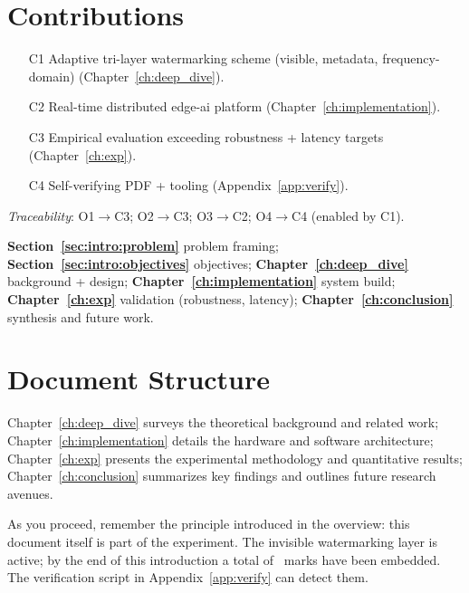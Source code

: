 \section{Contributions}
\label{sec:intro:contributions}

\begin{enumerate}
  \item[C1] Adaptive tri-layer watermarking scheme (visible, metadata, frequency-domain) (Chapter~\ref{ch:deep_dive}).
  \item[C2] Real-time distributed edge-\gls{ai} platform (Chapter~\ref{ch:implementation}).
  \item[C3] Empirical evaluation exceeding robustness + latency targets (Chapter~\ref{ch:exp}).
  \item[C4] Self-verifying PDF + tooling (Appendix~\ref{app:verify}).
\end{enumerate}

\noindent\textit{Traceability}: O1$\rightarrow$C3; O2$\rightarrow$C3; O3$\rightarrow$C2; O4$\rightarrow$C4 (enabled by C1).

\begin{roadmapbox}
\textbf{Section~\ref{sec:intro:problem}} problem framing; \textbf{Section~\ref{sec:intro:objectives}} objectives; \textbf{Chapter~\ref{ch:deep_dive}} background + design; \textbf{Chapter~\ref{ch:implementation}} system build; \textbf{Chapter~\ref{ch:exp}} validation (robustness, latency); \textbf{Chapter~\ref{ch:conclusion}} synthesis and future work.
\end{roadmapbox}

\section{Document Structure}
\label{sec:intro:structure}

Chapter~\ref{ch:deep_dive} surveys the theoretical background and related
work; Chapter~\ref{ch:implementation} details the hardware and
software architecture; Chapter~\ref{ch:exp} presents the experimental
methodology and quantitative results; Chapter~\ref{ch:conclusion}
summarizes key findings and outlines future research avenues.

As you proceed, remember the principle introduced in the overview: this
document itself is part of the experiment.
The invisible watermarking
layer is active; by the end of this introduction a total of \wmTotal\ marks
have been embedded.
The verification script in Appendix~\ref{app:verify} can detect them.


